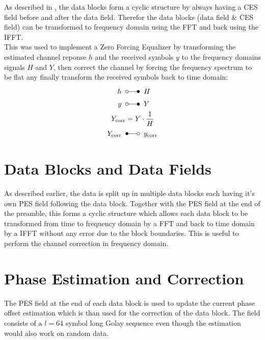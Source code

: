 As described in , the data blocks form a cyclic
structure by always having a \gls{CES} field before and after the data field.
Therefor the data blocks (data field \& \gls{CES} field) can be transformed
to frequency domain using the \gls{FFT} and back using the \gls{IFFT}. \\

This was used to implement a Zero Forcing Equalizer
by transforming
the estimated channel reponse $h$ and the received symbols $y$
to the frequency domains signals $H$ and $Y$, then correct the channel
by forcing the frequency spectrum to be flat any finally transform
the received symbols back to time domain: \\

\begin{align}
  h \;\;&\laplace\;\; H \\
  y \;\;&\laplace\;\; Y \\
  Y_{\text{corr}} &= Y \cdot \frac{1}{H} \\
  Y_{\text{corr}} \;\;&\Laplace\;\; y_{\text{corr}}
\end{align}

\section{Data Blocks and Data Fields}
\label{sec:sys_data}

As described earlier, the data is split up in multiple data blocks
each having it's own \gls{PES} field following the data block.
Together with the \gls{PES} field at the end of the preamble, this forms
a cyclic structure which allows each data block to be transformed
from time to frequency domain by a \gls{FFT} and back to time domain
by a \gls{IFFT} without any error due to the block boundaries.
This is useful to perform the channel correction in frequency domain. \\

\section{Phase Estimation and Correction}
\label{sec:sys_pes}

The \gls{PES} field at the end of each data block is used to update
the current phase offset estimation which is than used for the correction
of the data block. The field consists of a $l=64$ symbol long Golay
sequence even though the estimation would also work on random data. \\

